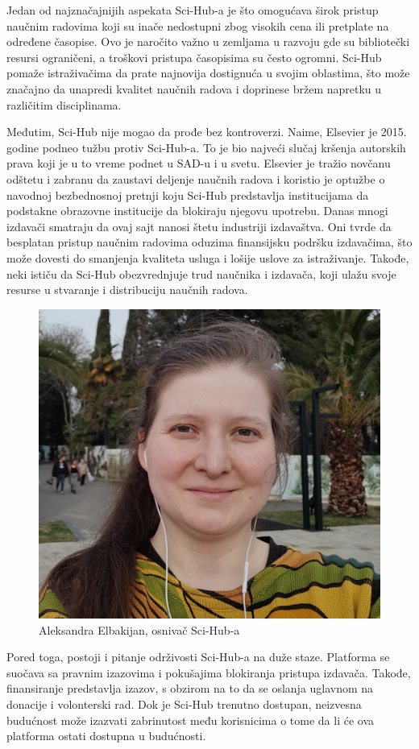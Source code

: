 \documentclass{article}
\begin{document}
Jedan od najznačajnijih aspekata Sci-Hub-a je što omogućava širok pristup naučnim radovima koji su inače nedostupni zbog visokih cena ili pretplate na određene časopise. Ovo je naročito važno u zemljama u razvoju gde su bibliotečki resursi ograničeni, a troškovi pristupa časopisima su često ogromni. Sci-Hub pomaže istraživačima da prate najnovija dostignuća u svojim oblastima, što može značajno da unapredi kvalitet naučnih radova i doprinese bržem napretku u različitim disciplinama.

Međutim, Sci-Hub nije mogao da prođe bez kontroverzi. Naime, Elsevier je 2015. godine podneo tužbu protiv Sci-Hub-a. To je bio najveći slučaj kršenja autorskih prava koji je u to vreme podnet u SAD-u i u svetu. Elsevier je tražio novčanu odštetu i zabranu da zaustavi deljenje naučnih radova i  koristio je optužbe o navodnoj bezbednosnoj pretnji koju Sci-Hub predstavlja institucijama da podstakne obrazovne institucije da blokiraju njegovu upotrebu. Danas mnogi izdavači smatraju da ovaj sajt nanosi štetu industriji izdavaštva. Oni tvrde da besplatan pristup naučnim radovima oduzima finansijsku podršku izdavačima, što može dovesti do smanjenja kvaliteta usluga i lošije uslove za istraživanje. Takođe, neki ističu da Sci-Hub obezvrednjuje trud naučnika i izdavača, koji ulažu svoje resurse u stvaranje i distribuciju naučnih radova.

\begin{figure}
    \centering
    \includegraphics[width=0.5\linewidth]{img/Alexandra_Elbakyan.jpg}
    \caption{Aleksandra Elbakijan, osnivač Sci-Hub-a}
\end{figure}

Pored toga, postoji i pitanje održivosti Sci-Hub-a na duže staze. Platforma se suočava sa pravnim izazovima i pokušajima blokiranja pristupa izdavača. Takođe, finansiranje predstavlja izazov, s obzirom na to da se oslanja uglavnom na donacije i volonterski rad. Dok je Sci-Hub trenutno dostupan, neizvesna budućnost može izazvati zabrinutost među korisnicima o tome da li će ova platforma ostati dostupna u budućnosti.
\end{document}
